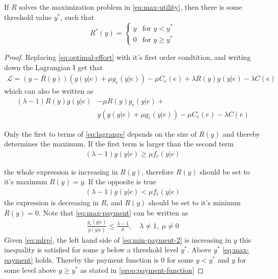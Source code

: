 \begin{proposition}
\label{prop:payment-function}
If $R$ solves the maximization problem in \cref{eq:max-utility}, then there is some threshold value $y^*$, such that 
\[
    R^*(y)=\left\{
    \begin{matrix}
    y               & \text{for } y< y^* \\
    0 & \text{for } y\geq y^*
    \end{matrix} \right.
\]

\end{proposition}

\begin{proof}
Replacing \cref{eq:optimal-effort} with it's first order condtition, and writing down the Lagrangian I get that 
\begin{align}
    \mathcal{L}=\left(y-R(y)\right)\left(g(y|e)+\mu g_e(y|e)\right)-\mu C_e(e)+\lambda R(y)g(y|e)-\lambda C(e)
\end{align}
which can also be written as 
\begin{equation}
\begin{split}
   (\lambda-1)R(y)g(y|e) & -\mu R(y)g_e(y|e)+ \\
                         & y\left(g(y|e)+\mu g_e(y|e)\right)-\mu C_e(e)-\lambda C(e) \label{eq:lagrange}
\end{split}
\end{equation}

Only the first to terms of \cref{eq:lagrange} depends on the size of $R(y)$ and thereby determines the maximum. If the first term is larger than the second term
\begin{align}
    (\lambda-1)g(y|e)\geq \mu f_e(y|e) \label{eq:max-payment}
\end{align}

the whole expression is increasing in $R(y)$, therefore $R(y)$ should be set to it's maximum $R(y)=y$. If the opposite is true 
\begin{align}
    (\lambda-1)g(y|e)< \mu f_e(y|e) \label{eq:min-payment}
\end{align}
the expression is decreasing in $R$, and $R(y)$ should be set to it's minimun $R(y)=0$. Note that \cref{eq:max-payment} can be written as
\begin{align}
    \frac{g_e(y|e)}{g(y|e)}\leq \frac{\lambda-1}{\mu}, \quad \lambda\ne 1,\: \mu\ne 0 \label{eq:min-payment-2}
\end{align}
Given \cref{eq:mlrp}, the left hand side of \cref{eq:min-payment-2} is increasing in $y$ this inequality is satisfied for some $y$ below a threshold level $y^*$. Above $y^*$ \cref{eq:max-payment} holds. Thereby the payment function is 0 for some $y<y^*$ and $y$ for some level above $y\geq y^*$ as stated in \cref{prop:payment-function}
\end{proof}


